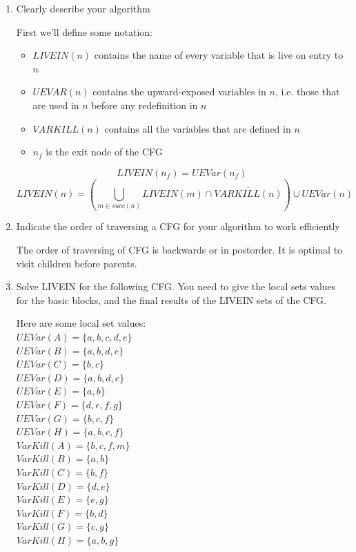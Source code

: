 \documentclass[11pt]{article}
\begin{document}
\begin{enumerate}
	\item Clearly describe your algorithm
	      \begin{Answer}
		      First we'll define some notation:
		      \begin{itemize}
			      \item $LIVEIN(n)$ contains the name of every variable that is live on entry to $n$
			      \item $UEVAR(n)$ contains the upward-exposed variables in $n$, i.e. those that are used in $n$ before any redefinition in $n$
			      \item $VARKILL(n)$ contains all the variables that are defined in $n$
			      \item $n_f$ is the exit node of the CFG
		      \end{itemize}
		      $$LIVEIN(n_f) = UEVar(n_f)$$
		      $$LIVEIN(n) = (\bigcup_{m \in succ(n)} LIVEIN(m) \cap \overline{VARKILL(n)}) \cup UEVar(n)$$
	      \end{Answer}
	\item Indicate the order of traversing a CFG for your algorithm to work efficiently
	      \begin{Answer}
		      The order of traversing of CFG is backwards or in postorder. It is optimal to visit children before parents.
	      \end{Answer}
	\item Solve LIVEIN for the following CFG. You need to give the local sets values for the basic
	      blocks, and the final results of the LIVEIN sets of the CFG.
	      \begin{Answer}
		      Here are some local set values: \\
		      $UEVar(A) = \{a, b, c, d, e\}$ \\
		      $UEVar(B) = \{a, b, d, e\}$ \\
		      $UEVar(C) = \{b, c\}$ \\
		      $UEVar(D) = \{a, b, d, e\}$ \\
		      $UEVar(E) = \{a, b\}$ \\
		      $UEVar(F) = \{d, e, f, g\}$ \\
		      $UEVar(G) = \{b, c, f\}$ \\
		      $UEVar(H) = \{a, b, c, f\}$ \\

		      $VarKill(A) = \{b, c, f, m\}$ \\
		      $VarKill(B) = \{a, b\}$ \\
		      $VarKill(C) = \{b, f\}$ \\
		      $VarKill(D) = \{d, e\}$ \\
		      $VarKill(E) = \{e, g\}$ \\
		      $VarKill(F) = \{b, d\}$ \\
		      $VarKill(G) = \{c, g\}$ \\
		      $VarKill(H) = \{a, b, g\}$ \\


\end{Answer}
\end{enumerate}
\end{document}
